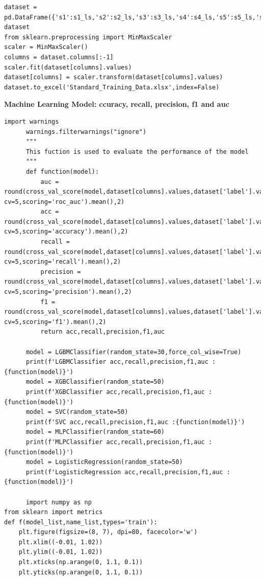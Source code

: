 \documentclass{article}
\begin{document}
\begin{lstlisting}[caption={Data Preprocessing and standardization}, label=python-example]
    dataset = pd.DataFrame({'s1':s1_ls,'s2':s2_ls,'s3':s3_ls,'s4':s4_ls,'s5':s5_ls,'s6':s6_ls,'s7':s7_ls,'s8':s8_ls,'s9':s9_ls,'s10':s10_ls,'s11':s11_ls,'s12':s12_ls,'s13':s13_ls,'s14':s14_ls,'s15':s15_ls,'s16':s16_ls,'label':label_ls})
dataset
from sklearn.preprocessing import MinMaxScaler
scaler = MinMaxScaler()
columns = dataset.columns[:-1]
scaler.fit(dataset[columns].values)
dataset[columns] = scaler.transform(dataset[columns].values)
dataset.to_excel('Standard_Training_Data.xlsx',index=False)
\end{lstlisting}

\textbf{Machine Learning Model: ccuracy, recall, precision, f1 and auc}
\begin{lstlisting}[caption={Machine Learning Model: ccuracy, recall, precision, f1 and auc}, label=python-example]
      import warnings
      warnings.filterwarnings("ignore")
      """
      This fuction is used to evaluate the performance of the model
      """
      def function(model):
          auc = round(cross_val_score(model,dataset[columns].values,dataset['label'].values, cv=5,scoring='roc_auc').mean(),2)
          acc = round(cross_val_score(model,dataset[columns].values,dataset['label'].values, cv=5,scoring='accuracy').mean(),2)
          recall = round(cross_val_score(model,dataset[columns].values,dataset['label'].values, cv=5,scoring='recall').mean(),2)
          precision = round(cross_val_score(model,dataset[columns].values,dataset['label'].values, cv=5,scoring='precision').mean(),2)
          f1 = round(cross_val_score(model,dataset[columns].values,dataset['label'].values, cv=5,scoring='f1').mean(),2)
          return acc,recall,precision,f1,auc

      model = LGBMClassifier(random_state=30,force_col_wise=True)
      print(f'LGBMClassifier acc,recall,precision,f1,auc :{function(model)}')
      model = XGBClassifier(random_state=50)
      print(f'XGBClassifier acc,recall,precision,f1,auc :{function(model)}')
      model = SVC(random_state=50)
      print(f'SVC acc,recall,precision,f1,auc :{function(model)}')
      model = MLPClassifier(random_state=60)
      print(f'MLPClassifier acc,recall,precision,f1,auc :{function(model)}')
      model = LogisticRegression(random_state=50)
      print(f'LogisticRegression acc,recall,precision,f1,auc :{function(model)}')

      import numpy as np
from sklearn import metrics
def f(model_list,name_list,types='train'):
    plt.figure(figsize=(8, 7), dpi=80, facecolor='w')
    plt.xlim((-0.01, 1.02))
    plt.ylim((-0.01, 1.02))
    plt.xticks(np.arange(0, 1.1, 0.1))
    plt.yticks(np.arange(0, 1.1, 0.1))


\end{lstlisting}
\end{document}
